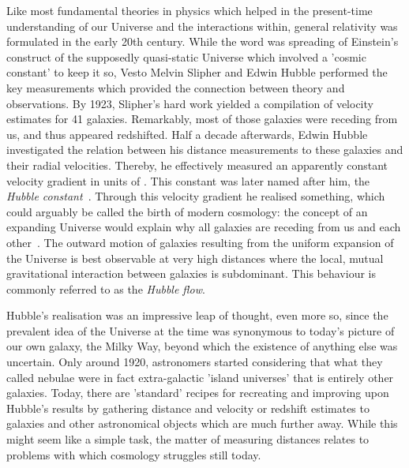 
Like most fundamental theories in physics which helped in the present-time
understanding of our Universe and the interactions within, general relativity
was formulated in the early 20th century.  While the word was spreading of
Einstein's construct of the supposedly quasi-static Universe which involved a
'cosmic constant' to keep it so, Vesto Melvin Slipher and Edwin Hubble performed
the key measurements which provided the connection between theory and
observations.  By 1923, Slipher's hard work yielded a compilation of velocity
estimates for 41 galaxies.  Remarkably, most of those galaxies were receding
from us, and thus appeared redshifted.  Half a decade afterwards, Edwin Hubble investigated the relation
between his distance measurements to these galaxies and their radial velocities.
Thereby, he effectively measured an apparently constant velocity gradient in
units of \Hunitsalt.  This constant was later named after him, the
\textit{Hubble constant}~\Ho.  Through this velocity gradient he realised
something, which could arguably be called the birth of modern cosmology: the
concept of an expanding Universe would explain why all galaxies are receding
from us and each other~.  The outward motion of galaxies resulting
from the uniform expansion of the Universe is best observable at very high
distances where the local, mutual gravitational interaction between galaxies is
subdominant.  This behaviour is commonly referred to as the \textit{Hubble
flow}.

Hubble's realisation was an impressive leap of thought, even more so, since the
prevalent idea of the Universe at the time was synonymous to today's picture of
our own galaxy, the Milky Way, beyond which the existence of anything else was
uncertain.  Only around 1920, astronomers started considering that what they
called nebulae were in fact extra-galactic 'island universes' that is entirely
other galaxies.  Today, there are 'standard' recipes for recreating and
improving upon Hubble's results by gathering
distance and velocity or redshift estimates to galaxies and other astronomical
objects which are much further away.  While this might seem like a simple task,
the matter of measuring distances relates to problems with which cosmology
struggles still today.  

